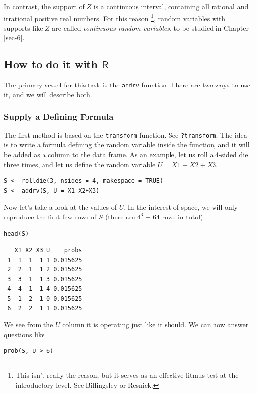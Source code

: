 \documentclass[captions=tableheading]{scrbook}
\begin{document}
In contrast, the support of \(Z\) is a continuous interval, containing all rational and irrational positive real numbers. For this reason
\footnote{This isn't really the reason, but it serves as an effective litmus test at the introductory level. See Billingsley or Resnick.},
random variables with supports like \(Z\) are called \emph{continuous random variables}, to be studied in Chapter \ref{sec-6}.
\subsection{How to do it with \(\mathsf{R}\)}
\label{sec-4-9-1}


The primary vessel for this task is the \texttt{addrv} function. There are two ways to use it, and we will describe both.
\subsubsection{Supply a Defining Formula}
\label{sec-4-9-1-1}


The first method is based on the \texttt{transform} function. See \texttt{?transform}. The idea is to write a formula defining the random variable inside the function, and it will be added as a column to the data frame. As an example, let us roll a 4-sided die three times, and let us define the random variable \(U=X1-X2+X3\). 


\lstset{language=R}
\begin{lstlisting}
S <- rolldie(3, nsides = 4, makespace = TRUE) 
S <- addrv(S, U = X1-X2+X3)
\end{lstlisting}

Now let's take a look at the values of \(U\). In the interest of space, we will only reproduce the first few rows of \(S\) (there are \(4^{3}=64\) rows in total). 


\lstset{language=R}
\begin{lstlisting}
head(S)
\end{lstlisting}

\begin{verbatim}
   X1 X2 X3 U    probs
 1  1  1  1 1 0.015625
 2  2  1  1 2 0.015625
 3  3  1  1 3 0.015625
 4  4  1  1 4 0.015625
 5  1  2  1 0 0.015625
 6  2  2  1 1 0.015625
\end{verbatim}

We see from the \(U\) column it is operating just like it should. We can now answer questions like


\lstset{language=R}
\begin{lstlisting}
prob(S, U > 6)
\end{lstlisting}
\end{document}
